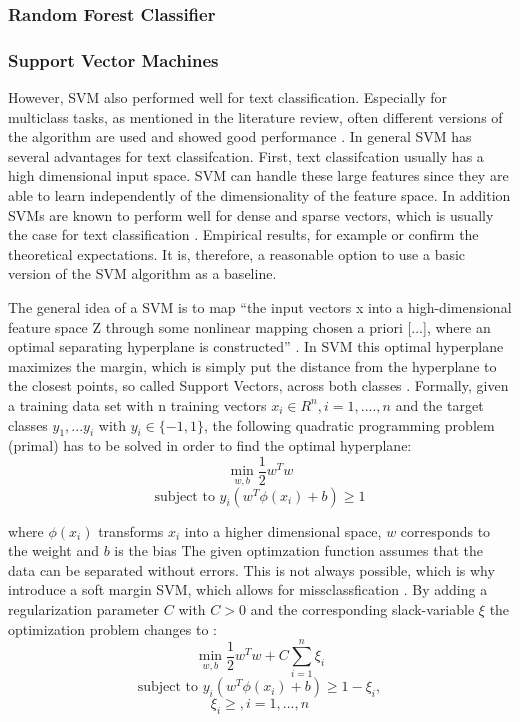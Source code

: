 \documentclass[12pt, a4paper, titlepage]{article}
\begin{document}
\subsubsection{Random Forest Classifier}

\subsubsection{Support Vector Machines}
However, \ac{SVM} also performed well for text classification. Especially for multiclass tasks, as mentioned in the literature review, often different versions of the algorithm are used and showed good performance \citep{Aiolli2005,Angulo2003,Benabdeslem2006,Guo2015,Mayoraz1999,Tang2019,Tomar2015}. In general \ac{SVM} has several advantages for text classifcation. First, text classifcation usually has a high dimensional input space. \ac{SVM} can handle these large features since they are able to learn independently of the dimensionality of the feature space. In addition \ac{SVM}s are known to perform well for dense and sparse vectors, which is usually the case for text classification \citep{Joachims1998}. Empirical results, for example \citet{Joachims1998} or \cite{Liu2010} confirm the theoretical expectations. It is, therefore, a reasonable option to use a basic version of the \ac{SVM} algorithm as a baseline.

The general idea of a \ac{SVM} is to map ``the input vectors x into a high-dimensional feature space Z through some nonlinear mapping chosen a priori [...], where an optimal separating hyperplane is constructed'' \citep[138]{Vapnik2000}. In \ac{SVM} this optimal hyperplane maximizes the margin, which is simply put the distance from the hyperplane to the closest points, so called Support Vectors, across both classes \citep{Han2012}. Formally, given a training data set with n training vectors $x_i \in R^n, i = 1,....,n$ and the target classes $y_1,...y_i$ with $y_i \in \{-1, 1\}$, the following quadratic programming problem (primal) has to be solved in order to find the optimal hyperplane:
\[\min_{w,b} \frac{1}{2}w^{T}w \] 
\[\text{subject to } y_i(w^T\phi(x_i)+b) \geq 1\]

where $\phi(x_i)$ transforms $x_i$ into a higher dimensional space, $w$ corresponds to the weight and $b$ is the bias \citep{Chang2001,Jordan2006}
The given optimzation function assumes that the data can be separated without errors. This is not always possible, which is why \cite{Cortes1995} introduce a soft margin \ac{SVM}, which allows for missclassfication \citep{Vapnik2000}.
By adding a regularization parameter $C$ with $C > 0$ and the corresponding slack-variable $\xi$ the optimization problem changes to \citep{Chang2001, Han2012}: 
\[\min_{w,b} \frac{1}{2}w^{T}w + C \sum_{i=1}^n \xi_i \] 
\[\text{subject to } y_i(w^T\phi(x_i)+b) \geq 1 - \xi_i, \] 
\[\xi_i \geq, i = 1,...,n\]
\end{document}
